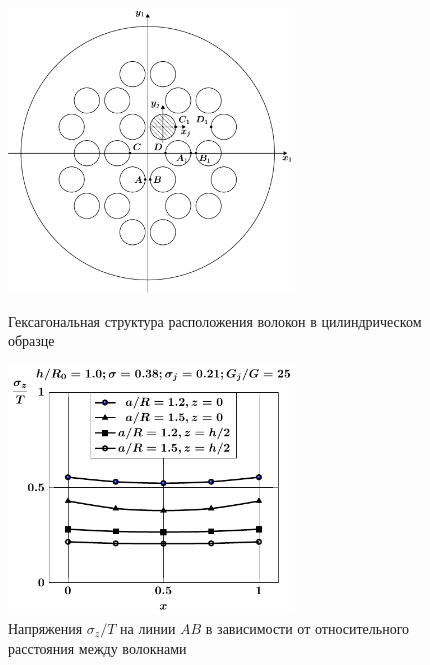 \begin{russian}
\begin{figure}[h!]
\centering\footnotesize
\parbox[b]{7.5cm}{\centering\includegraphics[width=7.6cm]{inc-24.pdf}
\caption{Гексагональная структура расположения волокон в цилиндрическом образце
\label{f:7:146}}}\hfil\hfil
\parbox[b]{7.5cm}{\centering\includegraphics[width=7.6cm]{inc6-a-sig_z.pdf}
\caption{Напряжения $\sigma_z/T$ на линии $AB$ в зависимости от относительного расстояния между волокнами
\label{f:7:79}}}
\end{figure}


\end{russian}
